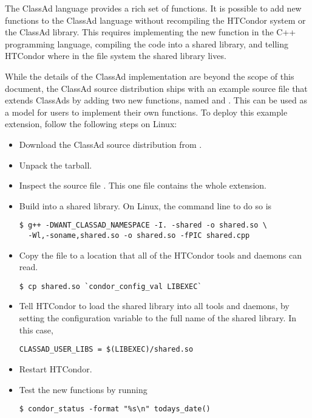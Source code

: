 The ClassAd language provides a rich set of functions.  It is possible
to add new functions to the ClassAd language without recompiling
the HTCondor system or the ClassAd library.  
This requires implementing the
new function in the C++ programming language, 
compiling the code into a shared library, 
and telling HTCondor where in the file system the shared library lives.

While the details of the ClassAd implementation are beyond the scope of 
this document,
the ClassAd source distribution ships with an example source file that 
extends ClassAds by adding two new functions,
named  and .  
This can be used as a model for users to implement
their own functions. 
To deploy this example extension, follow the following steps on Linux:

\begin{itemize}
\item{Download the ClassAd source distribution from 
.}
\item{Unpack the tarball.}
\item{Inspect the source file .
This one file contains the whole extension.}
\item{Build  into a shared library.  
On Linux, the command line to do so is
\begin{verbatim}
$ g++ -DWANT_CLASSAD_NAMESPACE -I. -shared -o shared.so \
  -Wl,-soname,shared.so -o shared.so -fPIC shared.cpp
\end{verbatim}
}
\item{Copy the file  to a location that all of 
the HTCondor tools and daemons can read.
\begin{verbatim}
$ cp shared.so `condor_config_val LIBEXEC`
\end{verbatim}
}
\item{Tell HTCondor to load the shared library into all tools and daemons, 
by setting the \Macro{CLASSAD\_USER\_LIBS} configuration variable
 to the full name of the shared library.  In this case,
\begin{verbatim}
CLASSAD_USER_LIBS = $(LIBEXEC)/shared.so
\end{verbatim}
}
\item{Restart HTCondor.}
\item{Test the new functions by running
\begin{verbatim}
$ condor_status -format "%s\n" todays_date()
\end{verbatim}
}

\end{itemize}

